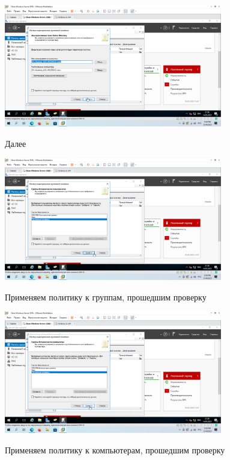 \documentclass[a4paper]{article}
\begin{document}
  \begin{figure}[H]
    \centering
    \includegraphics[width=0.85\textwidth]{5_0126}
    \label{img:126}
    \caption{Далее}
  \end{figure}

  \begin{figure}[H]
    \centering
    \includegraphics[width=0.85\textwidth]{5_0127}
    \label{img:127}
    \caption{Применяем политику к группам, прошедшим проверку}
  \end{figure}

  \begin{figure}[H]
    \centering
    \includegraphics[width=0.85\textwidth]{5_0128}
    \label{img:128}
    \caption{Применяем политику к компьютерам, прошедшим проверку}
  \end{figure}
\end{document}

